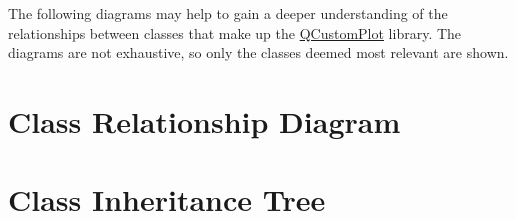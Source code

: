 The following diagrams may help to gain a deeper understanding of the relationships between classes that make up the \hyperlink{class_q_custom_plot}{Q\-Custom\-Plot} library. The diagrams are not exhaustive, so only the classes deemed most relevant are shown.\hypertarget{classoverview_classoverview-relations}{}\section{Class Relationship Diagram}\label{classoverview_classoverview-relations}
\hypertarget{classoverview_classoverview-inheritance}{}\section{Class Inheritance Tree}\label{classoverview_classoverview-inheritance}
